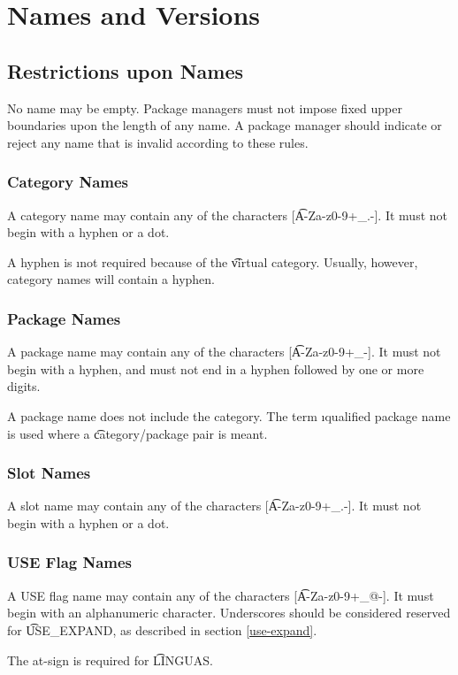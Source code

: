 \chapter{Names and Versions}

\section{Restrictions upon Names}

No name may be empty. Package managers must not impose fixed upper boundaries upon the length of any
name. A package manager should indicate or reject any name that is invalid according to these rules.

\subsection{Category Names}
A category name may contain any of the characters [\t{A-Za-z0-9+\_.-}]. It must not begin with
a hyphen or a dot.

\note A hyphen is \i{not} required because of the \t{virtual} category. Usually, however, category
names will contain a hyphen.

\subsection{Package Names}
A package name may contain any of the characters [\t{A-Za-z0-9+\_-}]. It must not begin with a
hyphen, and must not end in a hyphen followed by one or more digits.

\note A package name does not include the category. The term \i{qualified package name} is used
where a \t{category/package} pair is meant.

\subsection{Slot Names}
\label{slot-names}
A slot name may contain any of the characters [\t{A-Za-z0-9+\_.-}]. It must not begin with a
hyphen or a dot.

\subsection{USE Flag Names}
A USE flag name may contain any of the characters [\t{A-Za-z0-9+\_@-}]. It must begin with an
alphanumeric character. Underscores should be considered reserved for \t{USE\_EXPAND}, as
described in section \ref{use-expand}.

\note The at-sign is required for \t{LINGUAS}.

